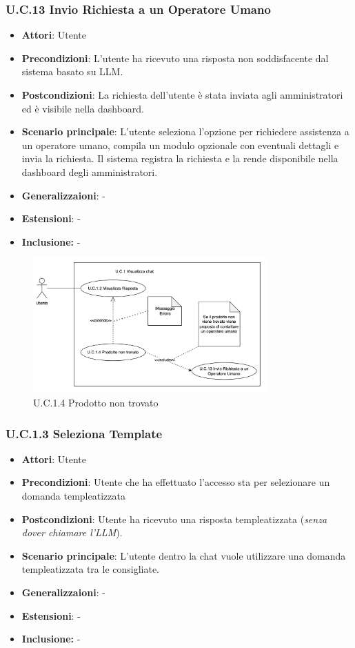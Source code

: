 \subsubsection{U.C.13 Invio Richiesta a un Operatore Umano}
\begin{itemize}
    \item \textbf{Attori}: Utente
    \item \textbf{Precondizioni}: L’utente ha ricevuto una risposta non soddisfacente dal sistema basato su LLM.
    \item \textbf{Postcondizioni}: La richiesta dell’utente è stata inviata agli amministratori ed è visibile nella dashboard.
    \item \textbf{Scenario principale}: L’utente seleziona l’opzione per richiedere assistenza a un operatore umano, compila un modulo opzionale con eventuali dettagli e invia la richiesta. Il sistema registra la richiesta e la rende disponibile nella dashboard degli amministratori.
    \item \textbf{Generalizzaioni}: -
    \item \textbf{Estensioni}: -
    \item \textbf{Inclusione:} -
\end{itemize}
\begin{figure}[h!]
    \centering
    \includegraphics[width=0.8\textwidth]{img/UC1-4.png}
    \caption{U.C.1.4 Prodotto non trovato}
\end{figure}
\subsubsection{U.C.1.3 Seleziona Template}
\begin{itemize}
    \item \textbf{Attori}: Utente
    \item \textbf{Precondizioni}: Utente che ha effettuato l’accesso sta per selezionare un domanda templeatizzata 
    \item \textbf{Postcondizioni}: Utente ha ricevuto una risposta templeatizzata (\textit{senza dover chiamare l’LLM}).
    \item \textbf{Scenario principale}: L’utente dentro la chat vuole utilizzare una domanda templeatizzata tra le consigliate.
    \item \textbf{Generalizzaioni}: -
    \item \textbf{Estensioni}: -
    \item \textbf{Inclusione:} -
\end{itemize}
